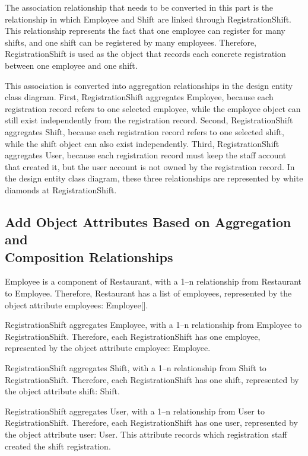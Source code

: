 The association relationship that needs to be converted in this part is the relationship in which Employee and Shift are linked through RegistrationShift. This relationship represents the fact that one employee can register for many shifts, and one shift can be registered by many employees. Therefore, RegistrationShift is used as the object that records each concrete registration between one employee and one shift.

This association is converted into aggregation relationships in the design entity class diagram. First, RegistrationShift aggregates Employee, because each registration record refers to one selected employee, while the employee object can still exist independently from the registration record. Second, RegistrationShift aggregates Shift, because each registration record refers to one selected shift, while the shift object can also exist independently. Third, RegistrationShift aggregates User, because each registration record must keep the staff account that created it, but the user account is not owned by the registration record. In the design entity class diagram, these three relationships are represented by white diamonds at RegistrationShift.


\subsection{Add Object Attributes Based on Aggregation and \\ Composition Relationships}


Employee is a component of Restaurant, with a 1--n relationship from Restaurant to Employee. Therefore, Restaurant has a list of employees, represented by the object attribute employees: Employee[].

RegistrationShift aggregates Employee, with a 1--n relationship from Employee to RegistrationShift. Therefore, each RegistrationShift has one employee, represented by the object attribute employee: Employee.

RegistrationShift aggregates Shift, with a 1--n relationship from Shift to RegistrationShift. Therefore, each RegistrationShift has one shift, represented by the object attribute shift: Shift.

RegistrationShift aggregates User, with a 1--n relationship from User to RegistrationShift. Therefore, each RegistrationShift has one user, represented by the object attribute user: User. This attribute records which registration staff created the shift registration.

